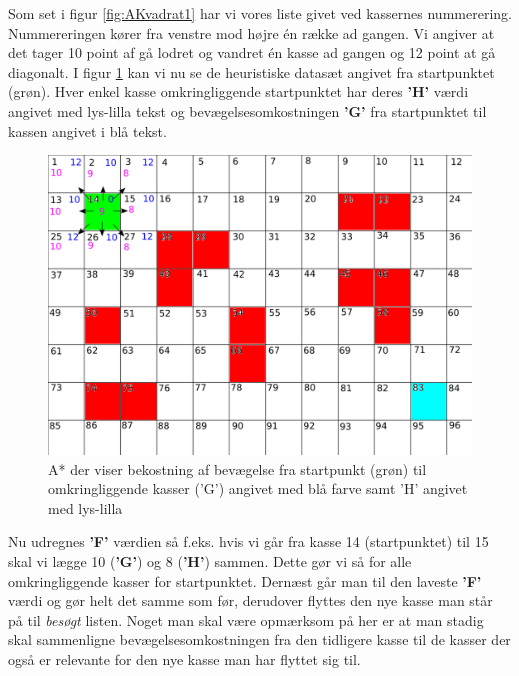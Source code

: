 Som set i figur \ref{fig:AKvadrat1} har vi vores liste givet ved kassernes nummerering. Nummereringen kører fra venstre mod højre én række ad gangen. Vi angiver at det tager 10 point af gå lodret og vandret én kasse ad gangen og 12 point at gå diagonalt. I figur \ref{fig:AKvadrat2} kan vi nu se de heuristiske datasæt angivet fra startpunktet (grøn). Hver enkel kasse omkringliggende startpunktet har deres \textbf{'H'} værdi angivet med lys-lilla tekst og bevægelsesomkostningen \textbf{'G'} fra startpunktet til kassen angivet i blå tekst.

\begin{figure}[ht!]
\begin{center}
\includegraphics[width=1.00\textwidth]{Pictures/Teoriafsnit/Figurfiler/Grid3.png}
\end{center}
\label{fig:AKvadrat2}
\caption{A* der viser bekostning af bevægelse fra startpunkt (grøn) til omkringliggende kasser ('G') angivet med blå farve samt 'H' angivet med lys-lilla}
\end{figure}

Nu udregnes \textbf{'F'} værdien så f.eks. hvis vi går fra kasse 14 (startpunktet) til 15 skal vi lægge 10 (\textbf{'G'}) og 8 (\textbf{'H'}) sammen. Dette gør vi så for alle omkringliggende kasser for startpunktet. Dernæst går man til den laveste \textbf{'F'} værdi og gør helt det samme som før, derudover flyttes den nye kasse man står på til \textit{besøgt} listen. Noget man skal være opmærksom på her er at man stadig skal sammenligne bevægelsesomkostningen fra den tidligere kasse til de kasser der også er relevante for den nye kasse man har flyttet sig til. 